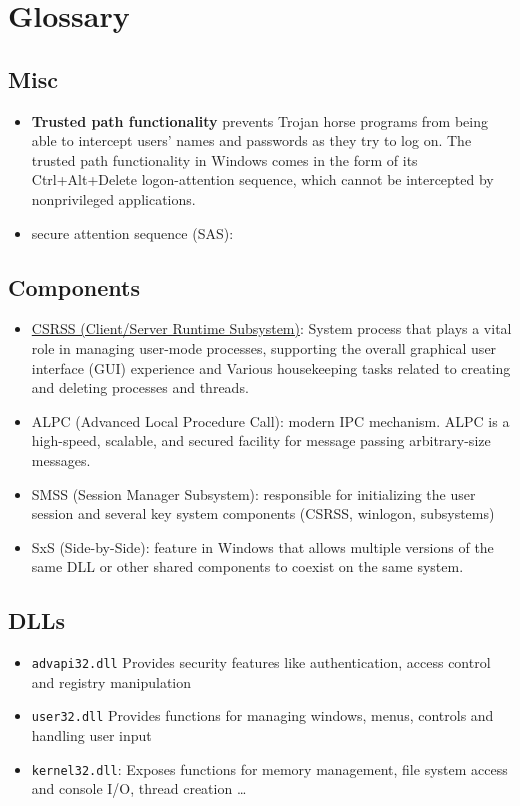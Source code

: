 \section{Glossary}

\subsection{Misc}
\begin{itemize}
    \item {\bf Trusted path functionality} prevents Trojan horse programs from being able to intercept users’ names and passwords as they try to log on. The trusted path functionality in Windows comes in the form of its Ctrl+Alt+Delete logon-attention sequence, which cannot be intercepted by nonprivileged applications.
    
    \item secure attention sequence (SAS): 
    
\end{itemize}

\subsection{Components}
\begin{itemize}
    \item \href{https://medium.com/@ijaz.faheem/windows-environment-subsystems-csrss-synch-with-windows-kernel-on-the-windows-user-process-164d57f2a81b}{CSRSS (Client/Server Runtime Subsystem)}: System process that plays a vital role in managing user-mode processes, supporting the overall graphical user interface (GUI) experience and Various housekeeping tasks related to creating and deleting processes and threads.
    \item ALPC (Advanced Local Procedure Call): modern IPC mechanism. ALPC is a high-speed, scalable, and secured facility for message passing arbitrary-size messages.
    \item SMSS (Session Manager Subsystem): responsible for initializing the user session and several key system components (CSRSS, winlogon, subsystems)
    \item SxS (Side-by-Side): feature in Windows that allows multiple versions of the same DLL or other shared components to coexist on the same system. 
\end{itemize}


\subsection{DLLs}

\begin{itemize}
    \item \verb+advapi32.dll+ Provides security features like authentication, access control and registry manipulation
    \item \verb+user32.dll+ Provides functions for managing windows, menus, controls and handling user input
    \item \verb+kernel32.dll+: Exposes functions for memory management, file system access and console I/O, thread creation \ldots
\end{itemize}